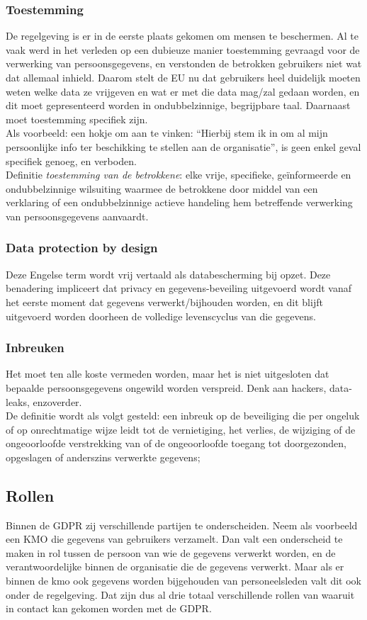 \subsubsection{Toestemming} 
De regelgeving is er in de eerste plaats gekomen om mensen te beschermen. Al te vaak werd in het verleden op een dubieuze manier toestemming gevraagd voor de verwerking van persoonsgegevens, en verstonden de betrokken gebruikers niet wat dat allemaal inhield. Daarom stelt de EU nu dat gebruikers heel duidelijk moeten weten welke data ze vrijgeven en wat er met die data mag/zal gedaan worden, en dit moet gepresenteerd worden in ondubbelzinnige, begrijpbare taal.
Daarnaast moet toestemming specifiek zijn.
\\ Als voorbeeld: een hokje om aan te vinken: “Hierbij stem ik in om al mijn persoonlijke info ter beschikking te stellen aan de organisatie”, is geen enkel geval specifiek genoeg, en verboden.\\ Definitie \textit{toestemming van de betrokkene}: elke vrije, specifieke, geïnformeerde en ondubbelzinnige wilsuiting waarmee de betrokkene door middel van een verklaring of een ondubbelzinnige actieve handeling hem betreffende verwerking van persoonsgegevens aanvaardt. 

\subsubsection{Data protection by design}
Deze Engelse term wordt vrij vertaald als databescherming bij opzet. Deze benadering impliceert dat privacy en gegevens-beveiling uitgevoerd wordt vanaf het eerste moment dat gegevens verwerkt/bijhouden worden, en dit blijft uitgevoerd worden doorheen de volledige levenscyclus van die gegevens. 

\subsubsection{Inbreuken} 
Het moet ten alle koste vermeden worden, maar het is niet uitgesloten dat bepaalde persoonsgegevens ongewild worden verspreid. Denk aan hackers, data-leaks, enzoverder.
\\ De definitie wordt als volgt gesteld: een inbreuk op de beveiliging die per ongeluk of op onrechtmatige wijze leidt tot de vernietiging, het verlies, de wijziging of de ongeoorloofde verstrekking van of de ongeoorloofde toegang tot doorgezonden, opgeslagen of anderszins verwerkte gegevens; 

\subsection{Rollen}
Binnen de GDPR zij verschillende partijen te onderscheiden. Neem als voorbeeld een KMO die gegevens van gebruikers verzamelt. Dan valt een onderscheid te maken in rol tussen de persoon van wie de gegevens verwerkt worden, en de verantwoordelijke binnen de organisatie die de gegevens verwerkt. Maar als er binnen de kmo ook gegevens worden bijgehouden van personeelsleden valt dit ook onder de regelgeving. Dat zijn dus al drie totaal verschillende rollen van waaruit in contact kan gekomen worden met de GDPR. 

